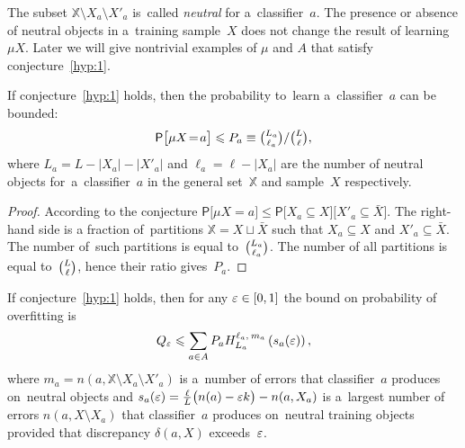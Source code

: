 \documentclass{article}
\def\AA{A}
\def\XX{\mathbb{X}}
\newcommand{\X}{\bar X}
\renewcommand{\leq}{\leqslant}
\def\CC_#1^#2{\tbinom{#1}{#2}}
\providecommand{\Prob}{\mathsf{P}}
\def\Prbig[#1]{\Prob\bigl[#1\bigr]}
\newcommand{\hypergeom}[5]{{#1}_{#2}^{#4,\:#3}\left(#5\right)}
\newcommand{\Hyper}[4]{\hypergeom{H}{#1}{#2}{#3}{#4}}
\renewcommand{\emph}[1]{\textit{#1}}
\begin{document}
The subset $\XX{\setminus} X_a{\setminus} X'_a$
is~called \emph{neutral} for a~classifier~$a$.
The presence or absence of neutral objects in a~training sample~$X$
does not change the result of learning~$\mu X$.
Later we will give nontrivial examples of $\mu$ and $A$ that satisfy conjecture~\ref{hyp:1}.

\begin{lemma}
\label{lem1}
    If conjecture~\ref{hyp:1} holds,
    then the probability to~learn a~classifier~$a$ can be bounded:
    \[
        \Prbig[ \mu X\!=\!a ]
        \leq
        P_a
        \equiv
        {\CC_{L_a}^{\ell_a}} / {\CC_{L}^{\ell}},
    \]
    where
    $L_a = L - |X_a| - |X'_a|$ and
    $\ell_a = \ell - |X_a|$
    are the number of neutral objects for~a~classifier~$a$ in the general set~$\XX$ and sample~$X$ respectively.
\end{lemma}
\begin{proof}
    According to the conjecture
    ${
        \Prbig[ \mu X\!=\!a ]
        \leq
        \Prob
        \bigl[  X_a\subseteq  X \bigr]
        \bigl[ X'_a\subseteq \X \bigr]
    }$.
    The right-hand side
    is a fraction of~partitions ${\XX=X\sqcup\X}$ such that
    ${X_a\subseteq  X}$ and ${X'_a\subseteq  \X}$.
    The number of~such partitions is equal to~$\CC_{L_a}^{\ell_a}$.
    The number of all partitions is equal to~$\CC_{L}^{\ell}$,
    hence their ratio gives~$P_a$.
\end{proof}

\begin{theorem}
\label{th:1}
    If conjecture~\ref{hyp:1} holds, then
    for any $\varepsilon\in[0,1]$
    the bound on probability of overfitting is
    \begin{equation}
    \label{eq:th1}
        Q_\eps
        \leq
        \sum_{a\in \AA} P_a \Hyper{L_a}{m_a}{\ell_a}{s_a(\eps)},
    \end{equation}
    where
    ${m_a = n(a,\XX{\setminus} X_a {\setminus} X'_a)}$
    is a~number of errors that classifier~$a$ produces on~neutral objects and
    ${s_a(\varepsilon) = \tfrac\ell L \bigl( n(a)-\varepsilon k \bigr) - n(a,X_a)}$
    is a~largest number of errors $n(a,X{\setminus}X_a)$
    that classifier~$a$ produces on~neutral training objects
    provided that discrepancy $\delta(a,X)$ exceeds~$\varepsilon$.
\end{theorem}
\end{document}
